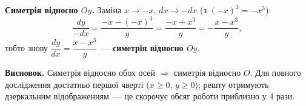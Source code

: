 \documentclass[12pt,a4paper]{article}
\begin{document}
\textbf{Симетрія відносно $Oy$.}
Заміна $x\to-x$, $dx\to-dx$ (з $(-x)^3=-x^3$):
\begin{equation*}
  \frac{dy}{-dx}=\frac{-x-(-x)^3}{y}=\frac{-x+x^3}{y}
  =-\frac{x-x^3}{y},
\end{equation*}
тобто знову $\dfrac{dy}{dx}=\dfrac{x-x^3}{y}$~--- \textbf{симетрія відносно $Oy$}.

\textbf{Висновок.} Симетрія відносно обох осей $\Rightarrow$ симетрія відносно $O$.
Для повного дослідження достатньо першої чверті ($x\ge0$, $y\ge0$); решту
отримують дзеркальним відображенням~--- це скорочує обсяг роботи приблизно
у 4 рази.
\end{document}
